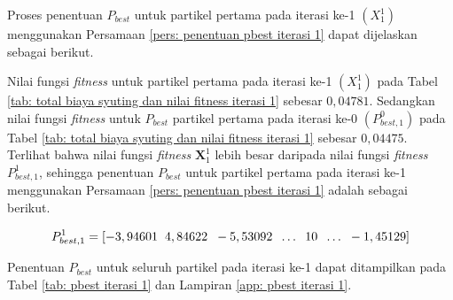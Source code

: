 {{\begin{enumerate}[align = left, left = 0cm, nolistsep]
\begin{enumerate}[label = (\alph*), align = left, left = 0cm, nolistsep]
                        Proses penentuan $P_{best}$ untuk partikel pertama pada iterasi ke-1 $(X_{1}^{1})$ menggunakan Persamaan \ref{pers: penentuan pbest iterasi 1} dapat dijelaskan sebagai berikut.

                        Nilai fungsi \textit{fitness} untuk partikel pertama pada iterasi ke-1 $(X_{1}^{1})$ pada Tabel \ref{tab: total biaya syuting dan nilai fitness iterasi 1} sebesar $0,04781$.
                        Sedangkan nilai fungsi \textit{fitness} untuk $P_{best}$ partikel pertama pada iterasi ke-0 $(P_{best,1}^{0})$ pada Tabel \ref{tab: total biaya syuting dan nilai fitness iterasi 1} sebesar $0,04475$.
                        Terlihat bahwa nilai fungsi \textit{fitness} $\boldsymbol{X}_{1}^{1}$ lebih besar daripada nilai fungsi \textit{fitness} $P_{best,1}^{1}$,
                        sehingga penentuan $P_{best}$ untuk partikel pertama pada iterasi ke-1 menggunakan Persamaan \ref{pers: penentuan pbest iterasi 1} adalah sebagai berikut.

                        \begin{equation*}
                            P_{best,1}^{1} = [-3,94601\hspace{2mm} 4,84622\hspace{2mm} -5,53092\hspace{2mm} \dots \hspace{2mm} 10\hspace{2mm} \dots\hspace{2mm} -1,45129]
                        \end{equation*}

                        Penentuan $P_{best}$ untuk seluruh partikel pada iterasi ke-1 dapat ditampilkan pada Tabel \ref{tab: pbest iterasi 1} dan Lampiran \ref{app: pbest iterasi 1}.


\end{enumerate}
\end{enumerate}}}
